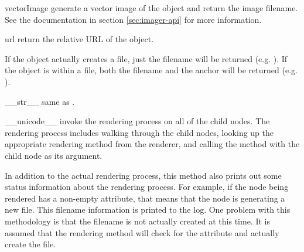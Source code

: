 \begin{memberdesc}[Renderable]{vectorImage}
generate a vector image of the object and return the image filename.  See
the  documentation in section \ref{sec:imager-api} for
more information.
\end{memberdesc}

\begin{memberdesc}[Renderable]{url}
return the relative URL of the object.  

If the object actually creates a file, just the filename will
be returned (e.g. ).  If the object is within a file, 
both the filename and the anchor will be returned 
(e.g. ).
\end{memberdesc}


\begin{methoddesc}[Renderable]{__str__}{}
same as .
\end{methoddesc}

\begin{methoddesc}[Renderable]{__unicode__}{}
invoke the rendering process on all of the child nodes.  The rendering process
includes walking through the child nodes, looking up the appropriate 
rendering method from the renderer, and calling the method with the child
node as its argument.

In addition to the actual rendering process, this method also prints out 
some status information about the rendering process.  For example, if 
the node being rendered has a non-empty  attribute, that
means that the node is generating a new file.  This filename information
is printed to the log.  One problem with this methodology is that the 
filename is not actually created at this time.  It is assumed that the
rendering method will check for the  attribute and actually
create the file.
\end{methoddesc}

